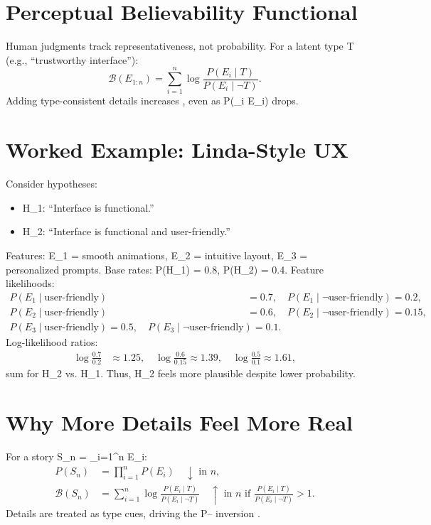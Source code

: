 \documentclass[openany]{book}
\begin{document}
\section{Perceptual Believability Functional}
\label{sec:conj-believability}
Human judgments track representativeness, not probability. For a latent type T (e.g., \textquotedblleft trustworthy interface\textquotedblright):
\begin{equation}
\label{eq:believability-functional}
\mathcal{B}(E_{1:n}) = \sum_{i=1}^n \log \frac{P(E_i \mid T)}{P(E_i \mid \neg T)}.
\end{equation}
Adding type-consistent details increases , even as P(\bigwedge_i E_i) drops.

\section{Worked Example: Linda-Style UX}
\label{sec:conj-example}
Consider hypotheses:
\begin{itemize}
  \item H_1: \textquotedblleft Interface is functional.\textquotedblright
  \item H_2: \textquotedblleft Interface is functional and user-friendly.\textquotedblright
\end{itemize}
Features: E_1 = smooth animations, E_2 = intuitive layout, E_3 = personalized prompts. Base rates: P(H_1) = 0.8, P(H_2) = 0.4. Feature likelihoods:
\begin{align*}
P(E_1 \mid \text{user-friendly}) &= 0.7, \quad P(E_1 \mid \neg \text{user-friendly}) = 0.2, \\
P(E_2 \mid \text{user-friendly}) &= 0.6, \quad P(E_2 \mid \neg \text{user-friendly}) = 0.15, \\
P(E_3 \mid \text{user-friendly}) = 0.5, \quad P(E_3 \mid \neg \text{user-friendly}) = 0.1.
\end{align*}
Log-likelihood ratios:
\begin{align*}
\log \frac{0.7}{0.2} &\approx 1.25, \quad \log \frac{0.6}{0.15} \approx 1.39, \quad \log \frac{0.5}{0.1} \approx 1.61,
\end{align*}
sum  for H_2 vs. H_1. Thus, H_2 feels more plausible despite lower probability.

\section{Why More Details Feel More Real}
\label{sec:conj-why}
For a story S_n = \bigwedge_{i=1}^n E_i:
\begin{align*}
P(S_n) &= \prod_{i=1}^n P(E_i) \quad \downarrow \text{ in } n, \\
\mathcal{B}(S_n) &= \sum_{i=1}^n \log \frac{P(E_i \mid T)}{P(E_i \mid \neg T)} \quad \uparrow \text{ in } n \text{ if } \frac{P(E_i \mid T)}{P(E_i \mid \neg T)} > 1.
\end{align*}
Details are treated as type cues, driving the P-- inversion \citep{tversky1983}.
\end{document}
